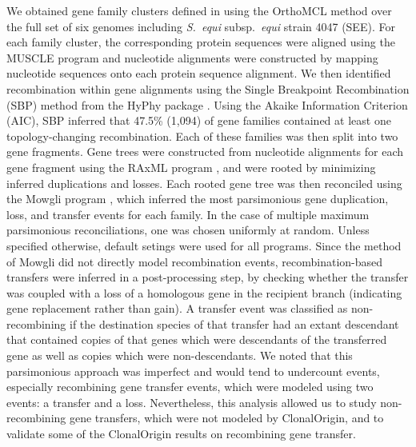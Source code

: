 \documentclass[english]{article}
\begin{document}
We obtained gene family clusters defined in \citet{Suzuki2011} 
using the OrthoMCL method \citep{Li2003} over the full set of six genomes
including \emph{S.\ equi} subsp.\emph{\ equi} strain 4047 (SEE). 
For each family cluster,
the corresponding protein sequences were aligned using the MUSCLE
program \citep{Edgar2004a} and nucleotide alignments were constructed
by mapping nucleotide sequences onto each protein sequence alignment. We then
identified recombination within gene alignments using the Single
Breakpoint Recombination (SBP) method from the HyPhy package
\citep{KosakovskyPond2006}.  Using the Akaike Information Criterion (AIC), SBP
inferred that 47.5\% (1,094) of gene families contained at least one
topology-changing recombination. Each of these families was then
split into two gene fragments.
Gene trees were constructed from nucleotide alignments for each
gene fragment using the RAxML program \citep{Stamatakis2006}, and were
rooted by minimizing inferred duplications and losses.  Each rooted
gene tree was then reconciled using the Mowgli program
\citep{Doyon2011}, which inferred the most parsimonious gene
duplication, loss, and transfer events for each family.  In the case
of multiple maximum parsimonious reconciliations, one was chosen
uniformly at random.  Unless specified otherwise, default setings were used for
all programs.
Since the method of Mowgli did not directly model recombination events, 
recombination-based transfers were inferred in a post-processing step, by 
checking whether the transfer was coupled with a loss of a homologous gene in 
the recipient branch (indicating gene replacement rather than gain). 
A transfer event was classified as non-recombining if the 
destination species of that transfer had an extant descendant that contained
copies of that genes which were descendants of the transferred gene as well as 
copies which were non-descendants.
We noted that this parsimonious approach was imperfect and would tend to 
undercount events, especially recombining gene transfer events, which were
modeled using two events: a transfer and a loss. Nevertheless, this analysis 
allowed us to study non-recombining gene transfers, which were not modeled by 
ClonalOrigin, and to validate some of the ClonalOrigin results on recombining 
gene transfer.
\end{document}
